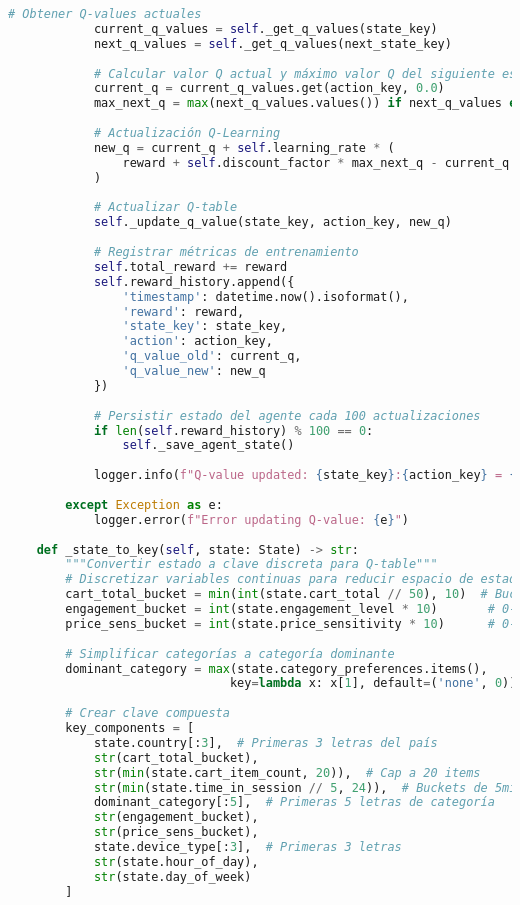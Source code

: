 \begin{lstlisting}[language=python, caption=Implementación Completa del Agente Q-Learning, label=lst:ql_implementation]
            # Obtener Q-values actuales
            current_q_values = self._get_q_values(state_key)
            next_q_values = self._get_q_values(next_state_key)
            
            # Calcular valor Q actual y máximo valor Q del siguiente estado
            current_q = current_q_values.get(action_key, 0.0)
            max_next_q = max(next_q_values.values()) if next_q_values else 0.0
            
            # Actualización Q-Learning
            new_q = current_q + self.learning_rate * (
                reward + self.discount_factor * max_next_q - current_q
            )
            
            # Actualizar Q-table
            self._update_q_value(state_key, action_key, new_q)
            
            # Registrar métricas de entrenamiento
            self.total_reward += reward
            self.reward_history.append({
                'timestamp': datetime.now().isoformat(),
                'reward': reward,
                'state_key': state_key,
                'action': action_key,
                'q_value_old': current_q,
                'q_value_new': new_q
            })
            
            # Persistir estado del agente cada 100 actualizaciones
            if len(self.reward_history) % 100 == 0:
                self._save_agent_state()
                
            logger.info(f"Q-value updated: {state_key}:{action_key} = {new_q:.4f} (reward: {reward})")
            
        except Exception as e:
            logger.error(f"Error updating Q-value: {e}")
    
    def _state_to_key(self, state: State) -> str:
        """Convertir estado a clave discreta para Q-table"""
        # Discretizar variables continuas para reducir espacio de estados
        cart_total_bucket = min(int(state.cart_total // 50), 10)  # Buckets de £50
        engagement_bucket = int(state.engagement_level * 10)       # 0-10
        price_sens_bucket = int(state.price_sensitivity * 10)      # 0-10
        
        # Simplificar categorías a categoría dominante
        dominant_category = max(state.category_preferences.items(), 
                               key=lambda x: x[1], default=('none', 0))[0]
        
        # Crear clave compuesta
        key_components = [
            state.country[:3],  # Primeras 3 letras del país
            str(cart_total_bucket),
            str(min(state.cart_item_count, 20)),  # Cap a 20 items
            str(min(state.time_in_session // 5, 24)),  # Buckets de 5min
            dominant_category[:5],  # Primeras 5 letras de categoría
            str(engagement_bucket),
            str(price_sens_bucket),
            state.device_type[:3],  # Primeras 3 letras
            str(state.hour_of_day),
            str(state.day_of_week)
        ]
        

\end{lstlisting}
